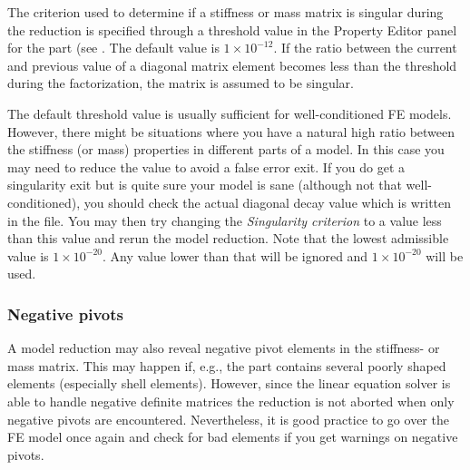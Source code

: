 
The criterion used to determine if a stiffness or mass matrix is
singular during the reduction is specified through a threshold value in
the Property Editor panel for the part (see
.
The default value is $1\times10^{-12}$. If the ratio between the current and
previous value of a diagonal matrix element becomes less than the threshold
during the factorization, the matrix is assumed to be singular.

The default threshold value is usually sufficient for well-conditioned
FE models. However, there might be situations where you have a natural high
ratio between the stiffness (or mass) properties in different parts of a model.
In this case you may need to reduce the value to avoid a false error exit.
If you do get a singularity exit but is quite sure your model is sane (although
not that well-conditioned), you should check the actual diagonal decay value
which is written in the  file.
You may then try changing the {\sl Singularity criterion} to a value less than
this value and rerun the model reduction.
Note that the lowest admissible value is $1\times10^{-20}$.
Any value lower than that will be ignored and $1\times10^{-20}$ will be used.

\subsubsection{Negative pivots}

A model reduction may also reveal negative pivot elements in the stiffness- or
mass matrix. This may happen if, e.g., the part contains several poorly shaped
elements (especially shell elements).
However, since the linear equation solver is able to handle negative definite
matrices the reduction is not aborted when only negative pivots are encountered.
Nevertheless, it is good practice to go over the FE model once again and check
for bad elements if you get warnings on negative pivots.



